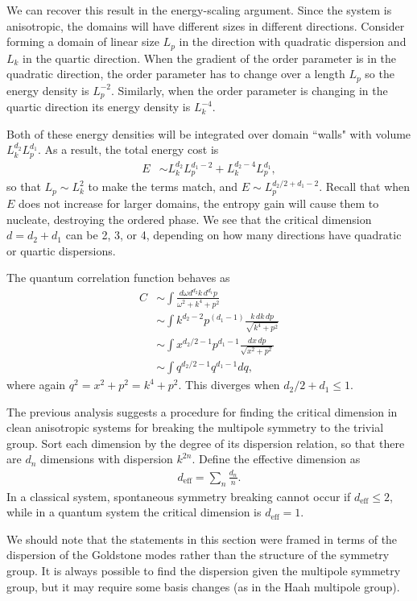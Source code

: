 \documentclass[twocolumn, longbibliography]{revtex4-2}
\newcommand{\nn}{\nonumber\\}
\newcommand{\eff}{\text{eff}}
\begin{document}
We can recover this result in  the energy-scaling argument. Since the system is anisotropic, the domains will have different sizes in different directions. Consider forming a domain of linear size $L_p$ in the  direction with quadratic dispersion and $L_k$ in the quartic direction. When the gradient of the order parameter is in the quadratic direction, the order parameter has to change over a length $L_p$ so the energy density is $L_p^{-2}$. Similarly, when the order parameter is changing in the quartic direction its energy density is $L_k^{-4}$. 

Both of these energy densities will be integrated over domain ``walls" with volume $L_k^{d_2} L_p^{d_1}$.
As a result, the total energy cost is
\begin{align}
E &\sim L_k^{d_2} L_p^{d_1-2} + L_k^{d_2-4} L_p^{d_1},
\end{align}
so that $L_p \sim L_k^2$ to make the terms match, and $E\sim L_p^{d_2/2+d_1-2}$. Recall that when $E$ does not increase for larger domains, the entropy gain will cause them to nucleate, destroying the ordered phase.
We see that the critical dimension $d= d_2 + d_1$ can be 2, 3, or 4, depending on how many directions have quadratic or quartic dispersions.

The quantum correlation function behaves as
\begin{align}
C &\sim \int \frac{d\omega d^{d_2} k \, d^{d_1} p}{\omega^2 + k^4 + p^2}\nn
&\sim \int k^{d_2 - 2} p^{ (d_1-1)} \frac{k\,dk\, dp}{\sqrt{k^4 + p^2}} \nn
&\sim \int x^{d_2/2-1} p^{d_1-1} \frac{dx\, dp}{\sqrt{x^2 + p^2}} \nn
&\sim \int q^{d_2/2 -1} q^{d_1 -1} dq,
\end{align}
where again $q^2 = x^2 + p^2 = k^4 + p^2$. This diverges when $d_2/2 + d_1 \le 1$. 

The previous analysis suggests a procedure for finding the critical dimension in clean anisotropic systems for breaking the multipole symmetry to the trivial group. Sort each dimension by the degree of its dispersion relation, so that there are $d_n$ dimensions with dispersion $k^{2n}$. Define the effective dimension as 
\begin{align}
d_\eff = \sum_n \frac{d_n}{n}.
\end{align}
In a classical system, spontaneous symmetry breaking cannot occur if $d_\eff\le 2$, while in a quantum system the critical dimension is $d_\eff = 1$.

We should note that the statements in this section were framed in terms of the dispersion of the Goldstone modes rather than the structure of the symmetry group. It is always possible to find the dispersion given the multipole symmetry group, but it may require some basis changes (as in the Haah multipole group).
\end{document}

